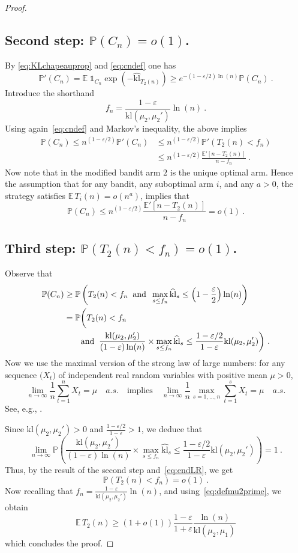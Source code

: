 \documentclass[11pt]{hackednow}
\newcommand{\kl}{\mathrm{kl}}
\renewcommand{\P}{\mathbb{P}}
\newcommand{\E}{\mathbb{E}}
\def\ds1{\mathds{1}}
\renewcommand{\epsilon}{\varepsilon}
\begin{document}
\begin{proof}
\subsection*{Second step: $\P(C_n) = o(1)$.}
By \eqref{eq:KLchapeauprop} and \eqref{eq:cndef} one has
$$\P'(C_n) = \E \; \ds1_{C_n} \exp\left(- \widehat{\kl}_{T_2(n)} \right) \geq e^{- (1-\epsilon/2) \ln(n)} \P(C_n)~.$$
Introduce the shorthand
\[
    f_n = \frac{1-\epsilon}{\kl(\mu_2,\mu_2')} \ln(n)~.
\]
Using again~\eqref{eq:cndef} and Markov's inequality, the above implies
\begin{align*}
\P(C_n) \leq n^{(1-\epsilon/2)} \P'(C_n)
&\leq n^{(1-\epsilon/2)} \P'(T_2(n) < f_n)
\\ &\leq n^{(1-\epsilon/2)} \frac{\E'[n - T_2(n)]}{n - f_n}~.
\end{align*}
Now note that in the modified bandit arm $2$ is the unique optimal arm. Hence the assumption that for any bandit, any suboptimal arm $i$, and any $a>0$, the strategy satisfies $\E\,T_i(n) = o(n^a)$, implies that
$$\P(C_n) \leq n^{(1-\epsilon/2)} \frac{\E'[n - T_2(n)]}{n - f_n} = o(1)~.$$ 

\subsection*{Third step: $\P\left(T_2(n) < f_n \right) = o(1)$.}
Observe that
\begin{align}
    \P(C_n)
& \ge
    \P\left(T_2(n) < f_n \;\; \text{and} \;\; \max_{s \le f_n} \widehat{\kl}_s \leq \left(1-\frac{\epsilon}{2}\right) \ln(n) \right)
\notag
\\&=
    \P\biggl(T_2(n) < f_n
\notag
\\&
    \qquad \text{and} \;\; \frac{\kl(\mu_2,\mu_2')}{(1-\epsilon) \ln(n)} \times \max_{s \le f_n} \widehat{\kl}_s \leq \frac{1-\epsilon/2}{1-\epsilon} \kl(\mu_2, \mu_2') \biggr)~.
\label{eq:endLR}
\end{align}
Now we use the maximal version of the strong law of large numbers: for any sequence $\bigl(X_t\bigr)$ of independent real random variables with positive mean $\mu > 0$,
\[
    \lim_{n\to\infty}\frac{1}{n}\sum_{t=1}^n X_t = \mu \quad a.s. \quad\text{implies}\quad
\lim_{n\to\infty}\frac{1}{n}\max_{s=1,\dots,n}\sum_{t=1}^s X_t = \mu \quad a.s.
\]
See, e.g., \cite[Lemma 10.5]{Bub10}.

Since $\kl(\mu_2,\mu_2')>0$ and $\frac{1-\epsilon/2}{1-\epsilon} > 1$, we deduce that
$$\lim_{n \to \infty} \P \left(\frac{\kl(\mu_2,\mu_2')}{(1-\epsilon) \ln(n)} \times \max_{s \le f_n} \widehat{\kl}_s \leq \frac{1-\epsilon/2}{1-\epsilon} \kl(\mu_2, \mu_2') \right) = 1~.$$
Thus, by the result of the second step and~\eqref{eq:endLR}, we get
$$\P\left(T_2(n) < f_n\right) = o(1)~.$$
Now recalling that $f_n = \frac{1-\epsilon}{\kl(\mu_2,\mu_2')} \ln(n)$, and using~\eqref{eq:defmu2prime}, we obtain
$$\E\,T_2(n) \geq (1+o(1)) \frac{1-\epsilon}{1+\epsilon} \frac{\ln(n)}{\kl(\mu_2,\mu_1)}$$
which concludes the proof.
\end{proof}
\end{document}
